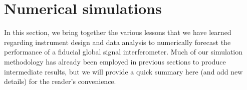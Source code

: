 \documentclass[twocolumn,apj,numberedappendix]{emulateapj}
\newcommand{\R}{\mathbf{R}}
\newcommand{\rhat}{\hat{\mathbf{r}}}
\newcommand{\Nbl}{N_{\textrm{bl}}}
\newcommand{\acl}[1]{{\color{red} \textbf{[ACL:  #1]}}}
\newcommand{\mep}[1]{{\color{applegreen} \textbf{[MEP:  #1]}}}
\begin{document}
%
%
%
%

\section{Numerical simulations}
\label{sec:SimResults}

In this section, we bring together the various lessons that we have learned regarding instrument design and data analysis to numerically forecast the performance of a fiducial global signal interferometer. Much of our simulation methodology has already been employed in previous sections to produce intermediate results, but we will provide a quick summary here (and add new details) for the reader's convenience.
\end{document}
